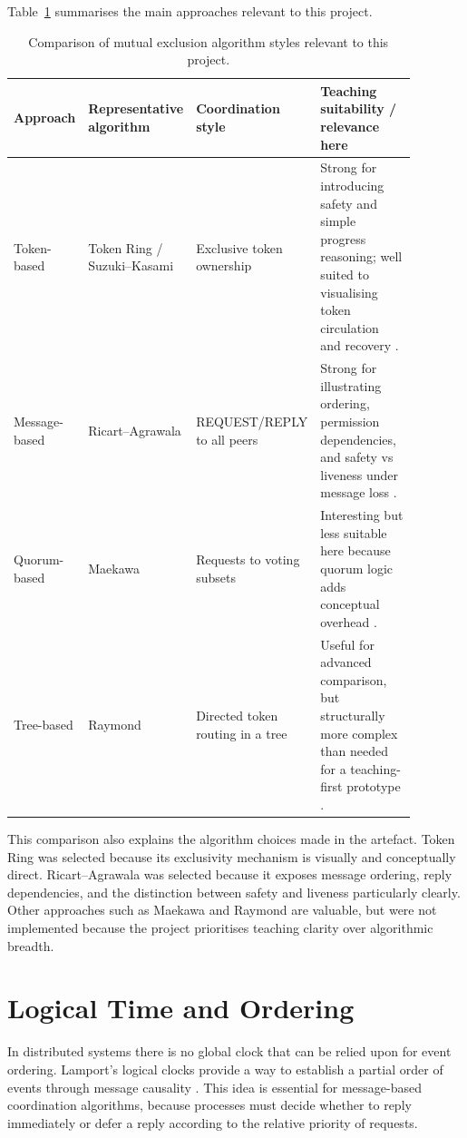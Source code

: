 Table~\ref{tab:algorithm-comparison} summarises the main approaches relevant to this project.

\begin{table}[htbp]
\centering
\small
\renewcommand{\arraystretch}{1.15}
\begin{tabular}{p{0.18\linewidth} p{0.18\linewidth} p{0.22\linewidth} p{0.30\linewidth}}
\toprule
\textbf{Approach} & \textbf{Representative algorithm} & \textbf{Coordination style} & \textbf{Teaching suitability / relevance here} \\
\midrule
Token-based & Token Ring / Suzuki--Kasami & Exclusive token ownership & Strong for introducing safety and simple progress reasoning; well suited to visualising token circulation and recovery \cite{suzuki1985distributed}. \\
Message-based & Ricart--Agrawala & REQUEST/REPLY to all peers & Strong for illustrating ordering, permission dependencies, and safety vs liveness under message loss \cite{ricart1981optimal}. \\
Quorum-based & Maekawa & Requests to voting subsets & Interesting but less suitable here because quorum logic adds conceptual overhead \cite{maekawa1985sqrt}. \\
Tree-based & Raymond & Directed token routing in a tree & Useful for advanced comparison, but structurally more complex than needed for a teaching-first prototype \cite{raymond1989tree}. \\
\bottomrule
\end{tabular}
\caption{Comparison of mutual exclusion algorithm styles relevant to this project.}
\label{tab:algorithm-comparison}
\end{table}

This comparison also explains the algorithm choices made in the artefact. Token Ring was selected because its exclusivity mechanism is visually and conceptually direct. Ricart--Agrawala was selected because it exposes message ordering, reply dependencies, and the distinction between safety and liveness particularly clearly. Other approaches such as Maekawa and Raymond are valuable, but were not implemented because the project prioritises teaching clarity over algorithmic breadth.

\section{Logical Time and Ordering}
In distributed systems there is no global clock that can be relied upon for event ordering. Lamport's logical clocks provide a way to establish a partial order of events through message causality \cite{lamport1978time}. This idea is essential for message-based coordination algorithms, because processes must decide whether to reply immediately or defer a reply according to the relative priority of requests.


